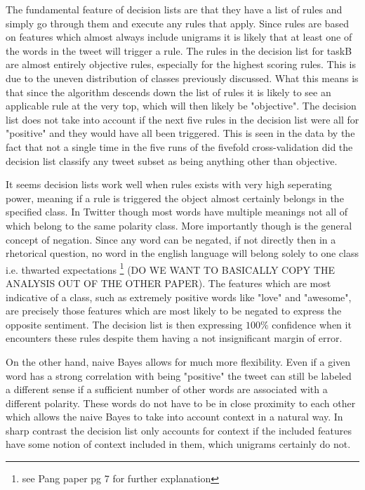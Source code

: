 \documentclass[11pt]{article}
\begin{document}
The fundamental feature of decision lists are that they have a list of rules and simply go through them and execute any rules that apply. Since rules are based on features which almost always include unigrams it is likely that at least one of the words in the tweet will trigger a rule. The rules in the decision list for taskB are almost entirely objective rules, especially for the highest scoring rules. This is due to the uneven distribution of classes previously discussed. What this means is that since the algorithm descends down the list of rules it is likely to see an applicable rule at the very top, which will then likely be "objective". The decision list does not take into account if the next five rules in the decision list were all for "positive" and they would have all been triggered. This is seen in the data by the fact that not a single time in the five runs of the fivefold cross-validation did the decision list classify any tweet subset as being anything other than objective.

It seems decision lists work well when rules exists with very high seperating power, meaning if a rule is triggered the object almost certainly belongs in the specified class. In Twitter though most words have multiple meanings not all of which belong to the same polarity class. More importantly though is the general concept of negation. Since any word can be negated, if not directly then in a rhetorical question, no word in the english language will belong solely to one class i.e. thwarted expectations \footnote{see Pang paper pg 7 for further explanation}  (DO WE WANT TO BASICALLY COPY THE ANALYSIS OUT OF THE OTHER PAPER). The features which are most indicative of a class, such as extremely positive words like "love" and "awesome", are precisely those features which are most likely to be negated to express the opposite sentiment. The decision list is then expressing $100\%$ confidence when it encounters these rules despite them having a not insignificant margin of error.

On the other hand, naive Bayes allows for much more flexibility. Even if a given word has a strong correlation with being "positive" the tweet can still be labeled a different sense if a sufficient number of other words are associated with a different polarity. These words do not have to be in close proximity to each other which allows the naive Bayes to take into account context in a natural way. In sharp contrast the decision list only accounts for context if the included features have some notion of context included in them, which unigrams certainly do not.
\end{document}
